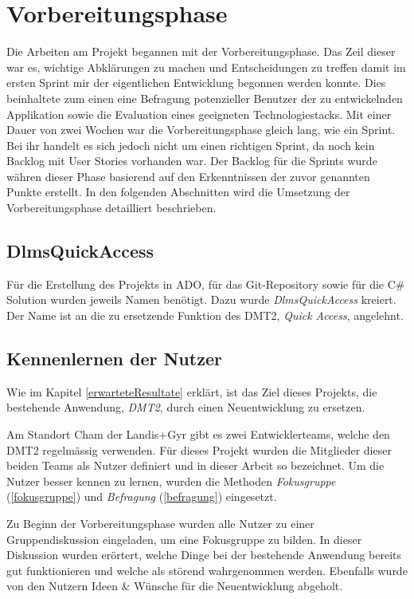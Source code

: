 \section{Vorbereitungsphase}
Die Arbeiten am Projekt begannen mit der Vorbereitungsphase. Das Zeil dieser war es, wichtige Abklärungen zu machen und Entscheidungen zu treffen damit im ersten Sprint mir der eigentlichen Entwicklung begonnen werden konnte.
Dies beinhaltete zum einen eine Befragung potenzieller Benutzer der zu entwickelnden Applikation sowie die Evaluation eines geeigneten Technologiestacks.
Mit einer Dauer von zwei Wochen war die Vorbereitungsphase gleich lang, wie ein Sprint. Bei ihr handelt es sich jedoch nicht um einen richtigen Sprint, da noch kein Backlog mit User Stories vorhanden war.
Der Backlog für die Sprints wurde währen dieser Phase basierend auf den Erkenntnissen der zuvor genannten Punkte erstellt.
In den folgenden Abschnitten wird die Umsetzung der Vorbereitungsphase detailliert beschrieben.

\subsection{DlmsQuickAccess}
Für die Erstellung des Projekts in \ac{ADO}, für das Git-Repository sowie für die C\# Solution wurden jeweils Namen benötigt.
Dazu wurde \textit{DlmsQuickAccess} kreiert.
Der Name ist an die zu ersetzende Funktion des \ac{DMT2}, \textit{Quick Access}, angelehnt.

\subsection{Kennenlernen der Nutzer}\label{survey}
Wie im Kapitel \ref{erwarteteResultate} erklärt, ist das Ziel dieses Projekts, die bestehende Anwendung, \textit{DMT2}, durch einen Neuentwicklung zu ersetzen.

Am Standort Cham der Landis+Gyr gibt es zwei Entwicklerteams, welche den \ac{DMT2} regelmässig verwenden.
Für dieses Projekt wurden die Mitglieder dieser beiden Teams als Nutzer definiert und in dieser Arbeit so bezeichnet.  %
Um die Nutzer besser kennen zu lernen, wurden die Methoden \textit{Fokusgruppe} (\ref{fokusgruppe}) und \textit{Befragung} (\ref{befragung}) eingesetzt.

Zu Beginn der Vorbereitungsphase wurden alle Nutzer zu einer Gruppendiskussion eingeladen, um eine Fokusgruppe zu bilden.
In dieser Diskussion wurden erörtert, welche Dinge bei der bestehende Anwendung bereits gut funktionieren und welche als störend wahrgenommen werden.
Ebenfalls wurde von den Nutzern Ideen \& Wünsche für die Neuentwicklung abgeholt.

